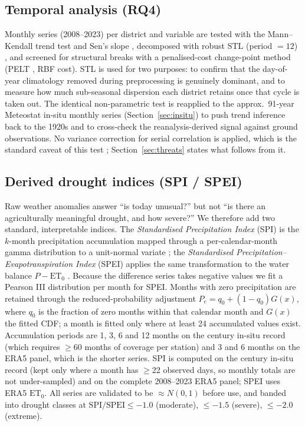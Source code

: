 \documentclass[preprint,12pt]{elsarticle}
\begin{document}
\subsection{Temporal analysis (RQ4)}\label{sec:temporal}
Monthly series (2008--2023) per district and variable are tested with the
Mann--Kendall trend test and Sen's slope \cite{sen1968,yue2004},
decomposed with robust STL (period $=12$) \cite{cleveland1990}, and screened for
structural breaks with a penalised-cost change-point method (PELT
\cite{killick2012}, RBF cost). STL is used for two purposes: to confirm that the
day-of-year climatology removed during preprocessing is genuinely dominant, and
to measure how much sub-seasonal dispersion each district retains once that cycle
is taken out. The identical non-parametric
test is reapplied to the {approx.~91-year} Meteostat in-situ monthly series
(Section~\ref{sec:insitu}) to push trend inference back to the 1920s and to
cross-check the reanalysis-derived signal against ground observations. No variance
correction for serial correlation is applied, which is the standard caveat of this
test \cite{hamed1998,yue2004}; Section~\ref{sec:threats} states what follows from
it.

\subsection{Derived drought indices (SPI / SPEI)}\label{sec:drought}
Raw weather anomalies answer ``is today unusual?'' but not ``is there an
agriculturally meaningful drought, and how severe?'' We therefore add two
standard, interpretable indices. The \emph{Standardised Precipitation Index}
(SPI) is the $k$-month precipitation accumulation mapped through a
per-calendar-month gamma distribution to a unit-normal variate
\cite{mckee1993}; the \emph{Standardised Precipitation--Evapotranspiration
Index} (SPEI) applies the same transformation to the water balance
$P-\mathrm{ET}_0$ \cite{vicente2010}. Because the difference series takes
negative values we fit a Pearson III distribution per month for SPEI. Months with
zero precipitation are retained through the reduced-probability adjustment
$P_e=q_0+(1-q_0)G(x)$, where $q_0$ is the fraction of zero months within that
calendar month and $G(x)$ the fitted CDF; a month is fitted only where at least
24 accumulated values exist. Accumulation periods are 1, 3, 6 and 12 months on the
century in-situ record (which requires $\geq$60 months of coverage per station) and
3 and 6 months on the ERA5 panel, which is the shorter series. SPI is computed on
the century in-situ record (kept only
where a month has $\geq$22 observed days, so monthly totals are not
under-sampled) and on the complete 2008--2023 ERA5 panel; SPEI uses ERA5
$\mathrm{ET}_0$. All series are validated to be $\approx N(0,1)$ before use,
and banded into drought classes at $\mathrm{SPI/SPEI}\leq-1.0$ (moderate),
$\leq-1.5$ (severe), $\leq-2.0$ (extreme).
\end{document}
